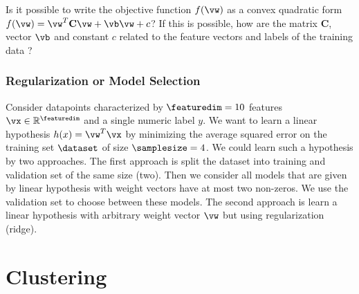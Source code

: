 \documentclass[12pt]{report}
\newcommand{\featurelen}{\featuredim}
\begin{document}
Is it possible to write the objective function $f(\vw)$ as a convex quadratic form 
$f(\vw) = \vw^{T} \mathbf{C} \vw + \vb \vw + c$? If this is possible, how are the 
matrix $\mathbf{C}$, vector $\vb$ and constant $c$ related to the feature vectors 
and labels of the training data ? 

\subsection{Regularization or Model Selection} 
Consider datapoints characterized by $\featurelen=10$ features $\vx \in \mathbb{R}^{\featurelen}$ 
and a single numeric label $y$. We want to learn a linear hypothesis $h(x) = \vw^{T} \vx$ by 
minimizing the average squared error on the training set $\dataset$ of size $\samplesize=4$. 
We could learn such a hypothesis by two approaches. The first approach is split the dataset 
into training and validation set of the same size (two). Then we consider all models that are given by 
linear hypothesis with weight vectors have at most two non-zeros. We use the validation 
set to choose between these models. The second approach is learn a linear hypothesis 
with arbitrary weight vector $\vw$ but using regularization (ridge). 



\newpage
\chapter{Clustering} 
\label{ch_Clustering}
\end{document}
